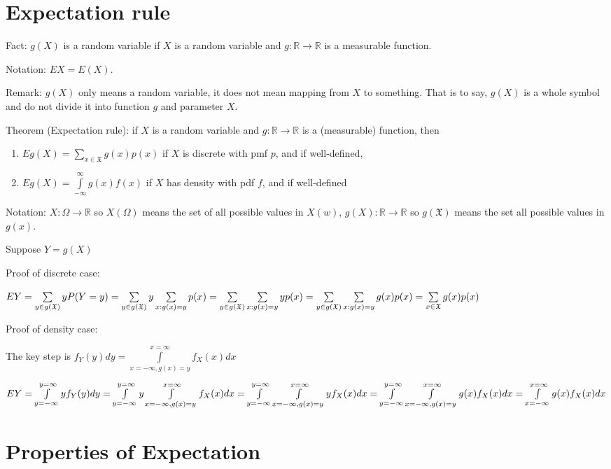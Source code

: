 \documentclass[12pt]{article}
\begin{document}
\section{Expectation rule}

Fact: $g(X)$ is a random variable if $X$ is a random variable and $g:\mathbb{R}\rightarrow\mathbb{R}$ is a measurable function.

Notation: $EX=E(X)$.

Remark: $g(X)$ only means a random variable, it does not mean mapping from $X$ to something. That is to say,
$g(X)$ is a whole symbol and do not divide it into function $g$ and parameter $X$.

Theorem (Expectation rule): if $X$ is a random variable and $g:\mathbb{R}\rightarrow\mathbb{R}$ is a (measurable) function,
then
\begin{enumerate}
    \item $Eg(X)=\sum\limits_{x\in\mathfrak{X}}g(x)p(x)$ if $X$ is discrete with pmf $p$, and if well-defined,
    \item $Eg(X)=\int\limits_{-\infty}^{\infty}g(x)f(x)$ if $X$ has density with pdf $f$, and if well-defined
\end{enumerate}

\bigbreak

Notation: $X:\Omega\rightarrow\mathbb{R}$ so $X(\Omega)$ means the set of all possible values in $X(w)$,
$g(X):\mathbb{R}\rightarrow\mathbb{R}$ so $g(\mathfrak{X})$ means the set all possible values in $g(x)$.

\bigbreak
Suppose $Y=g(X)$

Proof of discrete case:

$EY=\sum\limits_{y\in g(\mathfrak{X})} y P(Y=y) \\ 
= \sum\limits_{y\in g(\mathfrak{X})} y \sum\limits_{x:g(x)=y} p(x) \\ 
= \sum\limits_{y\in g(\mathfrak{X})}\sum\limits_{x:g(x)=y} y p(x) \\
= \sum\limits_{y\in g(\mathfrak{X})} \sum\limits_{x:g(x)=y} g(x) p(x) \\
= \sum\limits_{x\in \mathfrak{X}} g(x)p(x)$

\bigbreak
Proof of density case:

The key step is $f_Y(y) dy = \int\limits_{x=-\infty,g(x)=y}^{x=\infty} f_X(x) dx$

$EY = \int\limits_{y=-\infty}^{y=\infty} y f_{Y}(y) dy \\ 
= \int\limits_{y=-\infty}^{y=\infty} y \int\limits_{x=-\infty,g(x)=y}^{x=\infty} f_X(x)dx \\ 
= \int\limits_{y=-\infty}^{y=\infty} \int\limits_{x=-\infty,g(x)=y}^{x=\infty} y f_X(x)dx \\
= \int\limits_{y=-\infty}^{y=\infty} \int\limits_{x=-\infty,g(x)=y}^{x=\infty} g(x) f_X(x)dx \\
= \int\limits_{x=-\infty}^{x=\infty} g(x) f_X(x)dx$

\section{Properties of Expectation}
\end{document}
